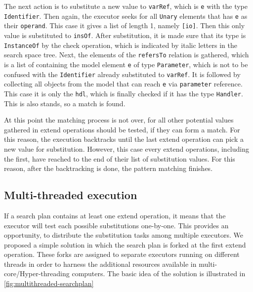 The next action is to substitute a new value to \texttt{varRef}, which is \texttt{e} with the type \texttt{Identifier}. Then again, the executor seeks for all \texttt{Unary} elements that has \texttt{e} as their \texttt{operand}. This case it gives a list of length 1, namely \texttt{[io]}. Then this only value is substituted to \texttt{insOf}. After substitution, it is made sure that its type is \texttt{InstanceOf} by the check operation, which is indicated by italic letters in the search space tree. Next, the elements of the \texttt{refersTo} relation is gathered, which is a list of containing the model element \texttt{e} of type \texttt{Parameter}, which is not to be confused with the \texttt{Identifier} already substituted to \texttt{varRef}. It is followed by collecting all objects from the model that can reach \texttt{e} via \texttt{parameter} reference. This case it is only the \texttt{hdl}, which is finally checked if it has the type \texttt{Handler}. This is also stands, so a match is found.

At this point the matching process is not over, for all other potential values gathered in extend operations should be tested, if they can form a match. For this reason, the execution backtracks until the last extend operation can pick a new value for substitution. However, this case every extend operations, including the first, have reached to the end of their list of substitution values. For this reason, after the backtracking is done, the pattern matching finishes.


\subsection{Multi-threaded execution}
\label{sec:parallel-search}

If a search plan contains at least one extend operation, it means that the executor will test each possible substitutions one-by-one. This provides an opportunity, to distribute the substitution tasks among multiple executors. We proposed a simple solution in which the search plan is forked at the first extend operation. These forks are assigned to separate executors running on different threads in order to harness the additional resources available in multi-core/Hyper-threading computers. The basic idea of the solution is illustrated in \autoref{fig:multithreaded-searchplan}

